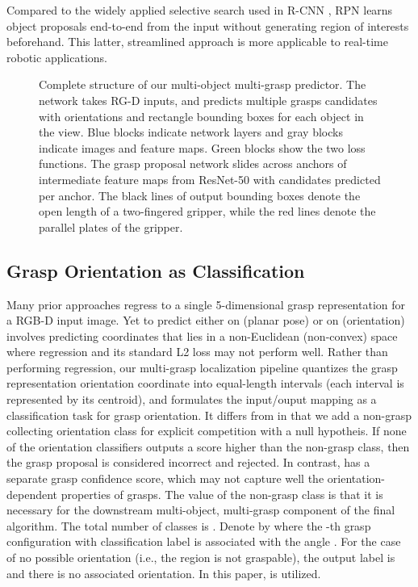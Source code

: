 \documentclass[letterpaper, 10 pt, journal, twoside]{IEEEtran}
\begin{document}
Compared to the widely applied selective search used in R-CNN
\cite{girshick2014rich}, RPN learns object proposals end-to-end from the
input without generating region of interests beforehand.  This latter,
streamlined approach is more applicable to real-time robotic applications.  


\begin{figure*}[t]
    \centering
\hspace*{-0.08in}


    \caption{Complete structure of our multi-object multi-grasp predictor.
    The network takes RG-D inputs, and predicts multiple grasps
    candidates with orientations and rectangle bounding boxes for each
    object in the view. Blue blocks indicate network layers and gray blocks
    indicate images and feature maps. Green blocks show the two loss
    functions. The grasp proposal network slides across anchors of
    intermediate feature maps from ResNet-50 with  candidates predicted
    per anchor. The black lines of output bounding boxes denote the
    open length of a two-fingered gripper, while the red lines denote the
    parallel plates of the gripper. \label{fig_structure}}
\end{figure*}

\subsection{Grasp Orientation as Classification}
Many prior approaches \cite{kumra2016robotic, redmon2015real} regress to a
single 5-dimensional grasp representation  for a
RGB-D input image. Yet to predict either on  (planar pose) or on 
(orientation) involves predicting coordinates that lies in a non-Euclidean
(non-convex) space where regression and its standard L2 loss may not perform
well.  
Rather than performing regression, our multi-grasp localization pipeline
quantizes the grasp representation orientation coordinate  into  
equal-length intervals (each interval is represented by its centroid), and
formulates the input/ouput mapping as a classification task for grasp
orientation.  
It differs from \cite{GuEtAl_ICRA2017} in that we add a non-grasp collecting
orientation class for explicit competition with a null hypotheis.  
If none of the orientation classifiers outputs a score
higher than the non-grasp class, then the grasp proposal is considered
incorrect and rejected.  In contrast, \cite{GuEtAl_ICRA2017} has a
separate grasp confidence score, which may not capture well the
orientation-dependent properties of grasps.
The value of the non-grasp class is that it is necessary for the
downstream multi-object, multi-grasp component of the final algorithm.
The total number of classes is . 
Denote by  where the -th grasp
configuration with classification label  is
associated with the angle .  For the case of no possible
orientation (i.e., the region is not graspable), the output label is 
and there is no associated orientation. In this paper,  is utilized. 
\end{document}
